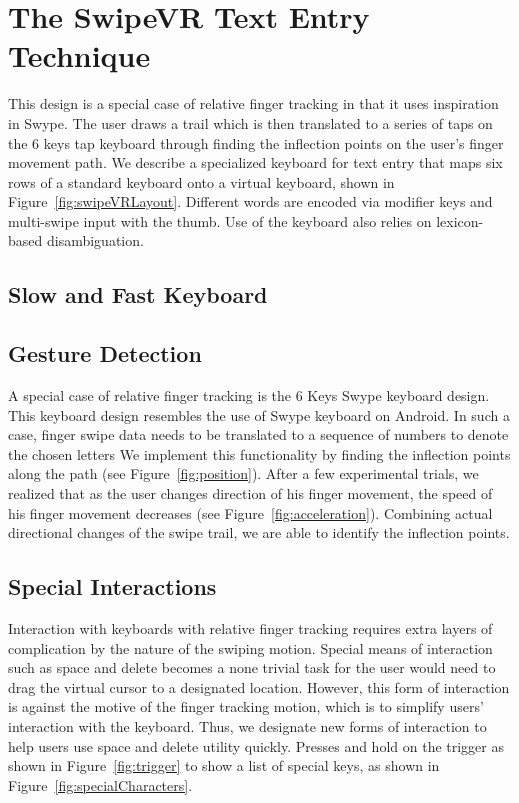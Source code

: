 \section{The SwipeVR Text Entry Technique}


This design is a special case of relative finger tracking in that it uses inspiration in Swype. 
The user draws a trail which is then translated to a series of taps on the 6 keys tap keyboard through finding the inflection points on the user's finger movement path.
We describe a specialized keyboard for text entry that maps six rows of a standard keyboard onto a virtual keyboard, shown in Figure~\ref{fig:swipeVRLayout}.
Different words are encoded via modifier keys and multi-swipe input with the thumb.
Use of the keyboard also relies on lexicon-based disambiguation.

\subsection{Slow and Fast Keyboard}
\subsection{Gesture Detection}
A special case of relative finger tracking is the 6 Keys Swype keyboard design.
This keyboard design resembles the use of Swype keyboard on Android.
In such a case, finger swipe data needs to be translated to a sequence of numbers to denote the chosen letters
We implement this functionality by finding the inflection points along the path (see Figure~\ref{fig:position}).
After a few experimental trials, we realized that as the user changes direction of his finger movement, the speed of his finger movement decreases (see Figure~\ref{fig:acceleration}).
Combining actual directional changes of the swipe trail, we are able to identify the inflection points. 

\subsection{Special Interactions}



Interaction with keyboards with relative finger tracking requires extra layers of complication by the nature of the swiping motion.
Special means of interaction such as space and delete becomes a none trivial task for the user would need to drag the virtual cursor to a designated location.
However, this form of interaction is against the motive of the finger tracking motion, which is to simplify users' interaction with the keyboard.
Thus, we designate new forms of interaction to help users use space and delete utility quickly.
Presses and hold on the trigger as shown in Figure~\ref{fig:trigger} to show a list of special keys, as shown in Figure~\ref{fig:specialCharacters}.


